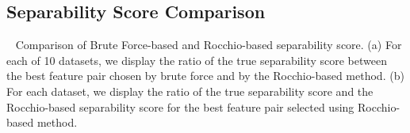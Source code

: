 \subsection{Separability Score Comparison}~\label{appF:exp_sep}
Comparison of Brute Force-based and Rocchio-based separability score. (a) For each of 10 datasets, we display the ratio of the true separability score between the best feature pair chosen by brute force and by the Rocchio-based method. (b) For each dataset, we display the ratio of the true separability score and the Rocchio-based separability score for the best feature pair selected using Rocchio-based method.
\begin{figure}[!htb]
\centering %
\vspace{-5mm}
\vspace{-5mm}
\label{fig:brute_rocchio}
\end{figure}


